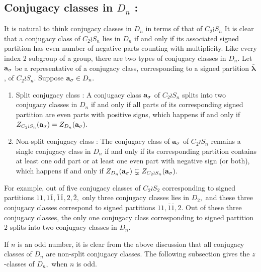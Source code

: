 \documentclass[12pt,twoside,reqno]{amsart}
\theoremstyle{definition}
\numberwithin{equation}{section}
\newcommand{\bmf}[1]{\mathbf{#1}}
\begin{document}
\subsection{Conjugacy classes in $D_n$ : }\label{ConjugacyClassesW(Dn)}
It is natural to think conjugacy classes in $D_n$ in terms of that of $C_2 \wr S_n$ It is clear that a conjugacy class of $C_2 \wr S_n$ lies in $D_n$ if and only if its associated signed partition has even number of negative parts counting with multiplicity. Like every index 2 subgroup of a group, there are two types of conjugacy classes in $D_n.$ Let $\bf{a_\sigma}$ be a representative of a conjugacy class, corresponding to a signed partition $\bmf{\bar{\lambda}}$, of $C_2 \wr S_n$. Suppose ${\bf a_\sigma}\in D_n.$ 
\begin{enumerate}
    \item Split conjugacy class : A conjugacy class $\bf{a_\sigma}$ of $C_2\wr S_n$ splits into two conjugacy classes in $D_n$ if and only if all parts of its corresponding signed partition are even parts with positive signs, which happens if and only if $Z_{C_2 \wr S_n}({\bf a_\sigma})= Z_{D_n}({\bf a_\sigma}).$
    \item Non-split conjugacy class : The conjugacy class of $\bf{a_\sigma}$ of $C_2 \wr S_n$ remains a single conjugacy class in $D_n$ if and only if its corresponding partition contains at least one odd part or at least one even part with negative sign (or both), which happens if and only if $Z_{D_n}({\bf a_\sigma}) \subsetneq Z_{C_2 \wr S_n}({\bf a_\sigma}).$
\end{enumerate}
For example, out of five conjugacy classes of $C_2 \wr S_2$ corresponding to signed partitions $11, 1\bar{1}, \bar{1}\bar{1}, 2, \bar{2},$ only three conjugacy classes lies in $D_2,$ and these three conjugacy classes correspond to signed partitions $11, \bar{1}\bar{1}, 2.$ Out of these three conjugacy classes, the only one conjugacy class corresponding to signed partition $2$ splits into two conjugacy classes in $D_n.$

If $n$ is an odd number, it is clear from the above discussion that all conjugacy classes of $D_n$ are non-split conjugacy classes. The following subsection gives the $z$-classes of $D_n,$ when $n$ is odd.
\end{document}
